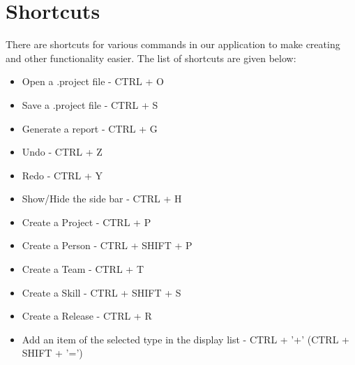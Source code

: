 \section{Shortcuts}

There are shortcuts for various commands in our application to make creating and other functionality easier. The list of shortcuts are given below:

\begin{itemize}
\item Open a .project file - CTRL + O
\item Save a .project file - CTRL + S
\item Generate a report - CTRL + G
\item Undo - CTRL + Z
\item Redo - CTRL + Y
\item Show/Hide the side bar - CTRL + H
\item Create a Project - CTRL + P
\item Create a Person - CTRL + SHIFT + P
\item Create a Team - CTRL + T
\item Create a Skill - CTRL + SHIFT + S
\item Create a Release - CTRL + R
\item Add an item of the selected type in the display list - CTRL + '+' (CTRL + SHIFT + '=')
\end{itemize}